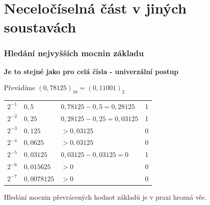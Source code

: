 \section{\texorpdfstring{Neceločíselná část v jiných soustavách}{Necelociselna cast v jinych soustavach}}

  \begin{frame}
    \frametitle{Hledání nejvyšších mocnin základu}
    \boldmath
    \textbf{Je to stejné jako pro celá čísla - univerzální postup}
    
    \vspace{5mm}
    Převádíme $(0,78125)_{10}=(0,11001)_{2}$
    
		\begin{center}
      \begin{tabular}{p{10mm} p{20mm} p{50mm} | p{10mm}}
        $2^{-1}$ & $0,5$ & $0,78125 - 0,5 = 0,28125$ & 1 \\
        $2^{-2}$ & $0,25$ & $0,28125-0,25=0,03125$ & 1 \\
        $2^{-3}$ & $0,125$ & $>0,03125$ & 0 \\
        $2^{-4}$ & $0,0625$ & $>0,03125$ & 0 \\
        $2^{-5}$ & $0,03125$ & $0,03125-0,03125=0$ & 1 \\
        $2^{-6}$ & $0,015625$ & $>0$ & 0 \\
        $2^{-7}$ & $0,0078125$ & $>0$ & 0 \\
      \end{tabular}
    \end{center}
    \vspace{5mm}
    Hledání mocnin převrácených hodnot základů je v praxi hrozná věc.
	\end{frame}

